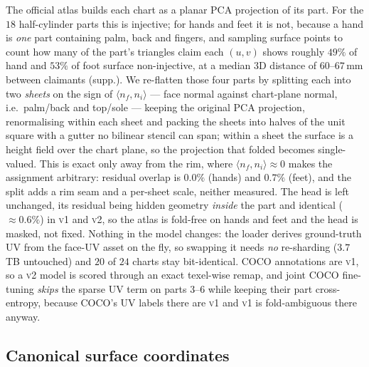 The official atlas builds each chart as a planar PCA projection of its part. For the $18$
half-cylinder parts this is injective; for hands and feet it is not, because a hand is \emph{one}
part containing palm, back and fingers, and sampling surface points to count how many of the part's
triangles claim each $(u,v)$ shows roughly $49\%$ of hand and $53\%$ of foot surface non-injective,
at a median $3$D distance of $60$--$67$\,mm between claimants (supp.). We re-flatten those four
parts by splitting each into two \emph{sheets} on the sign of $\langle n_f,n_i\rangle$ --- face
normal against chart-plane normal, i.e.\ palm/back and top/sole --- keeping the original PCA
projection, renormalising within each sheet and packing the sheets into halves of the unit square
with a gutter no bilinear stencil can span; within a sheet the surface is a height field over the
chart plane, so the projection that folded becomes single-valued. This is exact only away from the
rim, where $\langle n_f,n_i\rangle\!\approx\!0$ makes the assignment arbitrary: residual overlap is
$0.0\%$ (hands) and $0.7\%$ (feet), and the split adds a rim seam and a per-sheet scale, neither
measured. The head is left unchanged, its residual being hidden geometry \emph{inside} the part and
identical (${\approx}0.6\%$) in \textsc{v1} and \textsc{v2}, so the atlas is fold-free on hands and
feet and the head is masked, not fixed. Nothing in the model changes: the loader derives
ground-truth UV from the face-UV asset on the fly, so swapping it needs \emph{no} re-sharding
($3.7$\,TB untouched) and $20$ of $24$ charts stay bit-identical. COCO annotations are \textsc{v1},
so a \textsc{v2} model is scored through an exact texel-wise remap, and joint COCO fine-tuning
\emph{skips} the sparse UV term on parts $3$--$6$ while keeping their part cross-entropy, because
COCO's UV labels there are \textsc{v1} and \textsc{v1} is fold-ambiguous there anyway.

\subsection{Canonical surface coordinates}
\label{sec:csc}

